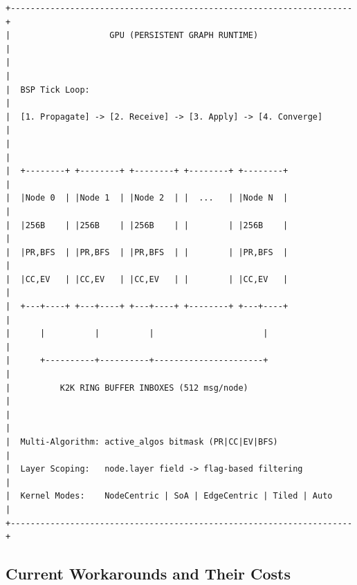 \documentclass[11pt,a4paper]{article}
\begin{document}
\begin{Verbatim}[fontsize=\small,frame=single,framesep=3mm]
+---------------------------------------------------------------------+
|                    GPU (PERSISTENT GRAPH RUNTIME)                    |
|                                                                      |
|  BSP Tick Loop:                                                      |
|  [1. Propagate] -> [2. Receive] -> [3. Apply] -> [4. Converge]      |
|                                                                      |
|  +--------+ +--------+ +--------+ +--------+ +--------+             |
|  |Node 0  | |Node 1  | |Node 2  | |  ...   | |Node N  |             |
|  |256B    | |256B    | |256B    | |        | |256B    |             |
|  |PR,BFS  | |PR,BFS  | |PR,BFS  | |        | |PR,BFS  |             |
|  |CC,EV   | |CC,EV   | |CC,EV   | |        | |CC,EV   |             |
|  +---+----+ +---+----+ +---+----+ +--------+ +---+----+             |
|      |          |          |                      |                   |
|      +----------+----------+----------------------+                   |
|          K2K RING BUFFER INBOXES (512 msg/node)                      |
|                                                                      |
|  Multi-Algorithm: active_algos bitmask (PR|CC|EV|BFS)                |
|  Layer Scoping:   node.layer field -> flag-based filtering           |
|  Kernel Modes:    NodeCentric | SoA | EdgeCentric | Tiled | Auto    |
+---------------------------------------------------------------------+
\end{Verbatim}

\subsection{Current Workarounds and Their Costs}
\end{document}
